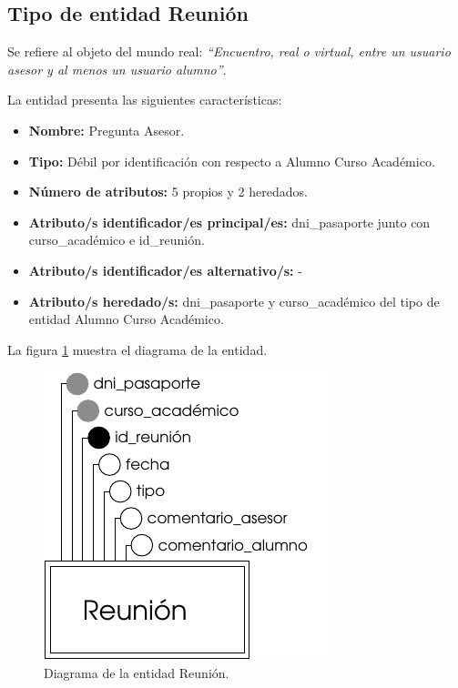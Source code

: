 \subsection{Tipo de entidad Reunión}

   \begin{description}

   \item[Definición] Se refiere al objeto del mundo real: \emph{``Encuentro,
   real o virtual, entre un usuario asesor y al menos un usuario alumno''}.

   \item[Características] La entidad presenta las siguientes características:
      \begin{itemize}
         \item \textbf{Nombre:} Pregunta Asesor.
         \item \textbf{Tipo:} Débil por identificación con respecto a
         Alumno Curso Académico.
         \item \textbf{Número de atributos:} 5 propios y 2 heredados.
         \item \textbf{Atributo/s identificador/es principal/es:} dni\_pasaporte
         junto con curso\_académico e id\_reunión.
         \item \textbf{Atributo/s identificador/es alternativo/s:} -
         \item \textbf{Atributo/s heredado/s:} dni\_pasaporte y curso\_académico
         del tipo de entidad Alumno Curso Académico.
      \end{itemize}

   \item[Diagrama] La figura \ref{diagramaReunion} muestra el diagrama de la entidad.
   \item \begin{figure}[!ht]
            \begin{center}
            \includegraphics[]{07.Modelo_Entidad-Interrelacion/7.2.Analisis_Entidades/diagramas/reunion.pdf}
            \caption{Diagrama de la entidad Reunión.}
            \label{diagramaReunion}
            \end{center}
         \end{figure}


\end{description}
